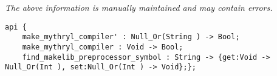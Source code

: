 \label{api:Mythryl\_Compiler\_Compiler}

{\tiny \it The above information is manually maintained and may contain errors.}
\begin{verbatim}
api {
    make_mythryl_compiler' : Null_Or(String ) -> Bool;
    make_mythryl_compiler : Void -> Bool;
    find_makelib_preprocessor_symbol : String -> {get:Void -> Null_Or(Int ), set:Null_Or(Int ) -> Void};};
\end{verbatim}
